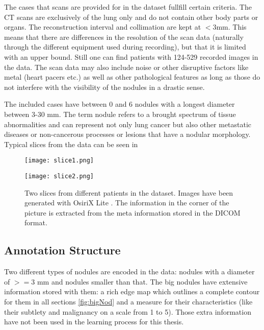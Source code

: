 \documentclass[../Thesis.tex]{subfiles}
\begin{document}
The cases that scans are provided for in the dataset fullfill certain criteria. The CT scans are exclusively of the lung only and do not contain other body parts or organs. The  reconstruction interval and collimation are kept at $<3$mm. This means that there are differences in the resolution of the scan data (naturally through the different equipment used during recording), but that it is limited with an upper bound. Still one can find patients with 124-529 recorded images in the data. The scan data may also include noise or other disruptive factors like metal (heart pacers etc.) as well as other pathological features as long as those do not interfere with the visibility of the nodules in a drastic sense.

The included cases have between 0 and 6 nodules with a longest diameter between 3-30 mm. The term nodule refers to a brought spectrum of tissue abnormalities and can represent not only lung cancer but also other metastatic diseases or non-cancerous processes or lesions that have a nodular morphology. Typical slices from the data can be seen in 

\begin{figure}[!tbp]
\centering
\begin{minipage}[b]{0.7\textwidth}
	\texttt{[image: slice1.png]}
\end{minipage}
\begin{minipage}[b]{0.7\textwidth}
	\texttt{[image: slice2.png]}
\end{minipage}
\caption{Two slices from different patients in the dataset. Images have been generated with OsiriX Lite \cite{rosset2004osirix}. The information in the corner of the picture is extracted from the meta information stored in the DICOM format.}
\label{fig:slices}
\end{figure}

\subsection{Annotation Structure}
Two different types of nodules are encoded in the data: nodules with a diameter of $>=3$ mm and nodules smaller than that. The big nodules have extensive information stored with them: a rich edge map which outlines a complete contour for them in all sections \ref{fig:bigNod} and a measure for their characteristics (like their subtlety and malignancy on a scale from 1 to 5). Those extra information have not been used in the learning process for this thesis.
\end{document}
